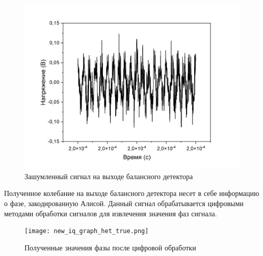 \begin{figure}
    \centering
    \includegraphics[width=\textwidth]{images/03.png}
    \caption{Зашумленный сигнал на выходе балансного детектора}
    \label{fig:noisy output inject}
\end{figure}
Полученное колебание на выходе балансного детектора несет в себе информацию о фазе, закодированную Алисой. Данный сигнал обрабатывается цифровыми методами обработки сигналов для извлечения значения фаз сигнала. 
\begin{figure}
    \centering
    \texttt{[image: new\_iq\_graph\_het\_true.png]}
    \caption{Полученные значения фазы после цифровой обработки}
    \label{fig:phase meas ijnect}
\end{figure}

